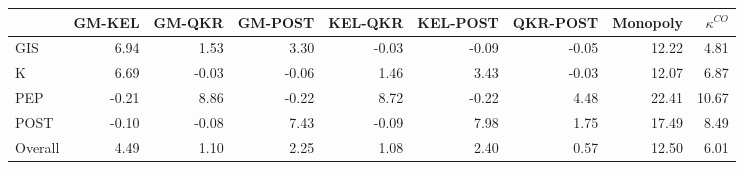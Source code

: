 \begin{tabular}{lrrrrrrrr}
\toprule
{} &  GM-KEL &  GM-QKR &  GM-POST &  KEL-QKR &  KEL-POST &  QKR-POST &  Monopoly &  $\kappa^{CO}$ \\
\midrule
GIS     &    6.94 &    1.53 &     3.30 &    -0.03 &     -0.09 &     -0.05 &     12.22 &           4.81 \\
K       &    6.69 &   -0.03 &    -0.06 &     1.46 &      3.43 &     -0.03 &     12.07 &           6.87 \\
PEP     &   -0.21 &    8.86 &    -0.22 &     8.72 &     -0.22 &      4.48 &     22.41 &          10.67 \\
POST    &   -0.10 &   -0.08 &     7.43 &    -0.09 &      7.98 &      1.75 &     17.49 &           8.49 \\
Overall &    4.49 &    1.10 &     2.25 &     1.08 &      2.40 &      0.57 &     12.50 &           6.01 \\
\bottomrule
\end{tabular}

